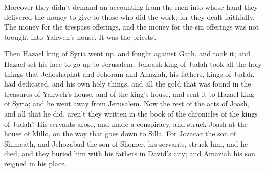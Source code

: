 {Moreover they didn’t demand an accounting from the men into whose hand they delivered the money to give to those who did the work; for they dealt faithfully.
The money for the trespass offerings, and the money for the sin offerings was not brought into Yahweh’s house. It was the priests’.
\par }{\PP {}Then Hazael king of Syria went up, and fought against Gath, and took it; and Hazael set his face to go up to Jerusalem.
Jehoash king of Judah took all the holy things that Jehoshaphat and Jehoram and Ahaziah, his fathers, kings of Judah, had dedicated, and his own holy things, and all the gold that was found in the treasures of Yahweh’s house, and of the king’s house, and sent it to Hazael king of Syria; and he went away from Jerusalem.
Now the rest of the acts of Joash, and all that he did, aren’t they written in the book of the chronicles of the kings of Judah?
His servants arose, and made a conspiracy, and struck Joash at the house of Millo, on the way that goes down to Silla.
For Jozacar the son of Shimeath, and Jehozabad the son of Shomer, his servants, struck him, and he died; and they buried him with his fathers in David’s city; and Amaziah his son reigned in his place.

}
